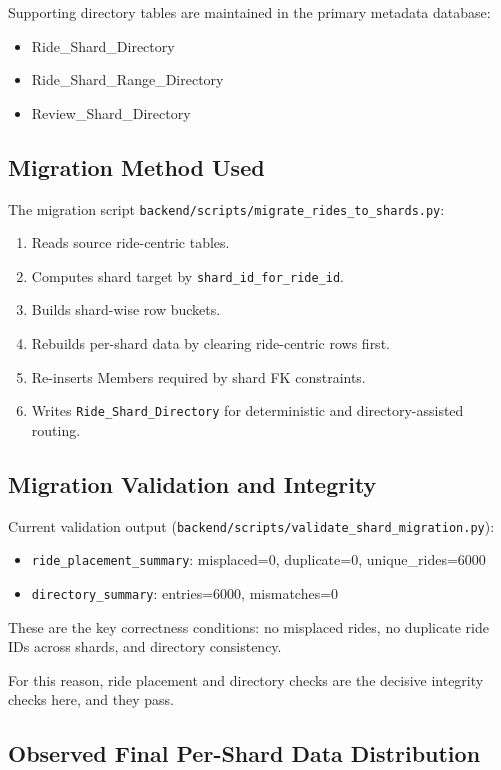\documentclass[12pt]{article}
\begin{document}
Supporting directory tables are maintained in the primary metadata database:
\begin{itemize}
    \item Ride\_Shard\_Directory
    \item Ride\_Shard\_Range\_Directory
    \item Review\_Shard\_Directory
\end{itemize}

\subsection{Migration Method Used}

The migration script \texttt{backend/scripts/migrate\_rides\_to\_shards.py}:
\begin{enumerate}
    \item Reads source ride-centric tables.
    \item Computes shard target by \texttt{shard\_id\_for\_ride\_id}.
    \item Builds shard-wise row buckets.
    \item Rebuilds per-shard data by clearing ride-centric rows first.
    \item Re-inserts Members required by shard FK constraints.
    \item Writes \texttt{Ride\_Shard\_Directory} for deterministic and directory-assisted routing.
\end{enumerate}

\subsection{Migration Validation and Integrity}

Current validation output (\texttt{backend/scripts/validate\_shard\_migration.py}):
\begin{itemize}
    \item \texttt{ride\_placement\_summary}: misplaced=0, duplicate=0, unique\_rides=6000
    \item \texttt{directory\_summary}: entries=6000, mismatches=0
\end{itemize}

These are the key correctness conditions: no misplaced rides, no duplicate ride IDs across shards, and directory consistency.

For this reason, ride placement and directory checks are the decisive integrity checks here, and they pass.

\subsection{Observed Final Per-Shard Data Distribution}
\end{document}
